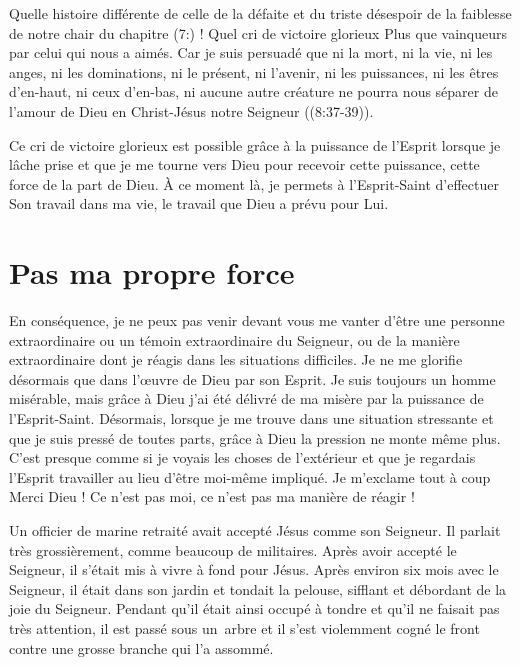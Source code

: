 Quelle histoire différente de celle de la défaite et du triste désespoir
 de la faiblesse de notre chair du chapitre (7:) !
 Quel cri de victoire glorieux\frcolon{}
 \Og Plus que vainqueurs par celui qui nous a aimés.
 Car je suis persuadé que ni la mort, ni la vie, ni les anges,
 ni les dominations, ni le présent, ni l'avenir, ni les puissances,
 ni les êtres d'en-haut, ni ceux d'en-bas, ni aucune autre créature
 ne pourra nous séparer de l'amour de Dieu en Christ-Jésus
 notre Seigneur \Fg{} ((8:37-39)).

Ce cri de victoire glorieux est possible grâce à la puissance de l'Es\-prit
 lorsque je lâche prise et que je me tourne vers Dieu pour recevoir
 cette puissance, cette force de la part de Dieu. À ce moment là,
 je permets à l'Esprit-Saint d'effectuer Son travail dans ma vie,
 le travail que Dieu a prévu pour Lui.


\section{Pas ma propre force}

En conséquence, je ne peux pas venir devant vous
 me vanter d'être une personne extraordinaire
 ou un témoin extraordinaire du Seigneur,
 ou de la manière extraordinaire dont je réagis dans les
 situations difficiles.
 Je ne me glorifie désormais que dans l'\oe{}uvre de Dieu par son Esprit.
 Je suis toujours un homme misérable, mais grâce à Dieu
 j'ai été délivré de ma misère par la puissance de l'Esprit-Saint.
 Désormais, lorsque je me trouve dans une situation stressante
 et que je suis pressé de toutes parts, grâce à Dieu la pression
 ne monte même plus.
 C'est presque comme si je voyais les choses de l'extérieur et que je regardais l'Esprit travailler
 au lieu d'être moi-même impliqué.
 Je m'exclame tout à coup\frcolon{}
 \Og Merci Dieu ! Ce n'est pas moi,
 ce n'est pas ma manière de réagir ! \Fg{}

Un officier de marine retraité avait accepté Jésus comme son Seigneur.
 Il parlait très grossièrement, comme beaucoup de militaires.
 Après avoir accepté le Seigneur, il s'était mis à vivre à fond pour Jésus.
 Après environ six mois avec le Seigneur, il était dans son jardin
 et tondait la pelouse, sifflant et débordant
 de la joie du Seigneur.
 Pendant qu'il était ainsi occupé à tondre et qu'il ne faisait pas très attention,
 il est passé sous un~arbre et il s'est violemment cogné le front contre une grosse branche
 qui l'a assommé.

